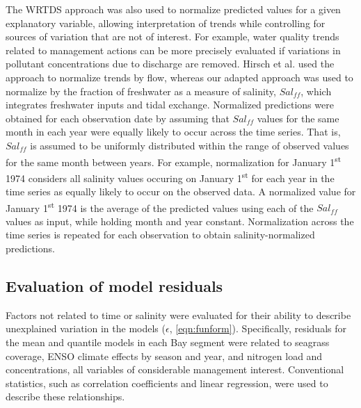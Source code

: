 \documentclass{svjour3}\usepackage[]{graphicx}\usepackage[]{color}
\begin{document}
The \ac{WRTDS} approach was also used to normalize predicted values for a given explanatory variable, allowing interpretation of trends while controlling for sources of variation that are not of interest.  For example, water quality trends related to management actions can be more precisely evaluated if variations in pollutant concentrations due to discharge are removed.  Hirsch et al. \cite{Hirsch10} used the approach to normalize trends by flow, whereas our adapted approach was used to normalize by the fraction of freshwater as a measure of salinity, $Sal_{ff}$, which integrates freshwater inputs and tidal exchange.  Normalized predictions were obtained for each observation date by assuming that $Sal_{ff}$ values for the same month in each year were equally likely to occur across the time series.  That is, $Sal_{ff}$ is assumed to be uniformly distributed within the range of observed values for the same month between years.  For example, normalization for January 1\textsuperscript{st} 1974 considers all salinity values occuring on January 1\textsuperscript{st} for each year in the time series as equally likely to occur on the observed data.  A normalized value for January 1\textsuperscript{st} 1974 is the average of the predicted values using each of the $Sal_{ff}$ values as input, while holding month and year constant.  Normalization across the time series is repeated for each observation to obtain salinity-normalized predictions.    

\subsection{Evaluation of model residuals}

Factors not related to time or salinity were evaluated for their ability to describe unexplained variation in the models ($\epsilon$, \cref{eqn:funform}). Specifically, residuals for the mean and quantile models in each Bay segment were related to seagrass coverage, \ac{ENSO} climate effects by season and year, and nitrogen load and concentrations, all variables of considerable management interest.  Conventional statistics, such as correlation coefficients and linear regression, were used to describe these relationships.
\end{document}
